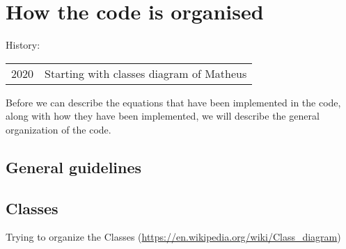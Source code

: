 \hypertarget{chap:code_org}{}
\chapter{How the code is organised}
\label{sec:code_org}
\chapterauthor{}

{History:
  
  \begin{tabular}{l@{ - }l}
     2020 & Starting with classes diagram of Matheus\\
  \end{tabular}
}\vspace{3cm}


Before we can describe the equations that have been implemented in the code,
along with how they have been implemented,
we will describe the general organization of the code.

\section{General guidelines}


\newpage
\section{Classes}
Trying to organize the Classes (\url{https://en.wikipedia.org/wiki/Class\_diagram})





